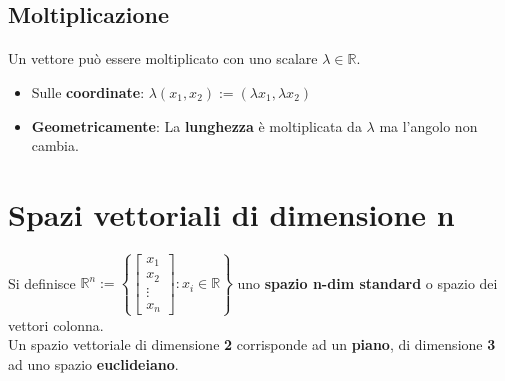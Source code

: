 \documentclass[a4paper, 12pt]{report}
\begin{document}
            \subsection{Moltiplicazione}
            \paragraph{}Un vettore può essere moltiplicato con uno scalare $\lambda \in \mathbb{R}$.
            \begin{itemize}
                \item Sulle \textbf{coordinate}: $\lambda (x_1,x_2):=(\lambda x_1,\lambda x_2)$
                \item \textbf{Geometricamente}: La \textbf{lunghezza} è moltiplicata da $\lambda$ ma l'angolo non cambia.
            \end{itemize}
        \section{Spazi vettoriali di dimensione n}
            \paragraph{}Si definisce $\mathbb{R}^n:= \left \{
            \begin{bmatrix}
            x_1\\
            x_2\\
            \vdots\\
            x_n    
            \end{bmatrix}
            : x_i \in \mathbb{R}
            \right \}
            $
            uno \textbf{spazio n-dim standard} o spazio dei vettori colonna.\\
            Un spazio vettoriale di dimensione \textbf{2} corrisponde ad un \textbf{piano}, di dimensione \textbf{3} ad uno
            spazio \textbf{euclideiano}.
\end{document}
